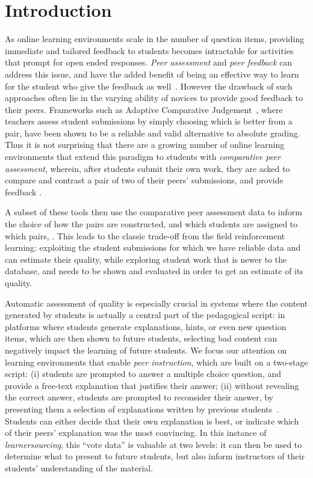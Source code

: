 \documentclass[runningheads]{llncs}
\begin{document}
\section{Introduction}
As online learning environments scale in the number of question items, providing 
immediate and tailored feedback to students becomes intractable for activities 
that prompt for open ended responses. \textit{Peer assessment} and \textit{peer 
feedback} can address this issue, and have the added benefit of being an 
effective way to learn for the student who give the feedback as 
well~\cite{jhangiani_impact_2016}. 
However the drawback of such approaches often lie in the varying ability of 
novices to provide good feedback to their peers.
Frameworks such as Adaptive Comparative Judgement~\cite{pollitt_method_2012}, 
where teachers assess student submissions by simply choosing which is better 
from a pair, have been shown to be a reliable and valid alternative to absolute 
grading.
Thus it is not surprising that there are a growing number of online learning 
environments that extend this paradigm to students with \textit{comparative 
peer assessment}, wherein, after students submit their own work, they are asked 
to compare and contrast a pair of two of their peers' submissions, and provide 
feedback
\cite{univeristy_of_british_columbia_ubc/ubcpi_2019}
\cite{cambre_juxtapeer:_2018}
\cite{potter_compair:_2017}.

A subset of these tools then use the comparative peer assessment data to 
inform the choice of how the pairs are constructed, and which students are 
assigned to which pairs,
\cite{khosravi_ripple_2019}
\cite{williams_axis:_2016}
\cite{saltise_saltises4/dalite-ng_2019}.
This leads to the classic trade-off from the field reinforcement learning: 
exploiting the student submissions for which we have reliable data and can 
estimate their quality, while exploring student work that is newer to the 
database, and needs to be shown and evaluated in order to get an estimate of 
its quality.

Automatic assessment of quality is especially crucial in systems where the 
content generated by students is actually a central part of the pedagogical 
script: in platforms where students generate explanations, hints, or even new 
question items, which are then shown to future students, selecting bad content 
can negatively impact the learning of future students. 
We focus our attention on learning environments that enable \textit{peer 
instruction}\cite{crouch_peer_2001}, which are built on a two-stage script: (i) 
students are prompted to answer a multiple choice question, and provide a 
free-text explanation that justifies their answer; (ii) without revealing the 
correct answer, students are prompted to reconsider their answer, by presenting 
them a selection of explanations written by previous 
students~\cite{charles-woods_designing_nodate}.
Students can either decide that their own explanation is best, or indicate 
which of their peers' explanation was the most convincing.
In this instance of 
\textit{learnersourcing}\cite{weir_learnersourcing_2015}, this ``vote data'' 
is valuable at two levels: it can then be used to determine what to present to 
future students, but also inform instructors of their students' understanding 
of the material.
\end{document}
